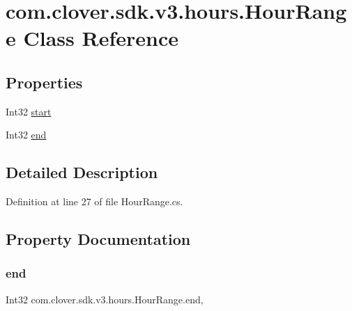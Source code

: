 \hypertarget{classcom_1_1clover_1_1sdk_1_1v3_1_1hours_1_1_hour_range}{}\section{com.\+clover.\+sdk.\+v3.\+hours.\+Hour\+Range Class Reference}
\label{classcom_1_1clover_1_1sdk_1_1v3_1_1hours_1_1_hour_range}
\subsection*{Properties}
\begin{DoxyCompactItemize}
\item 
Int32 \hyperlink{classcom_1_1clover_1_1sdk_1_1v3_1_1hours_1_1_hour_range_a60dfdcfa17bb5b0e7ef47fdf5b3d6cde}{start}
\item 
Int32 \hyperlink{classcom_1_1clover_1_1sdk_1_1v3_1_1hours_1_1_hour_range_a282272ee5138fddb43bba1e960b979c8}{end}
\end{DoxyCompactItemize}


\subsection{Detailed Description}


Definition at line 27 of file Hour\+Range.\+cs.



\subsection{Property Documentation}
\mbox{\label{classcom_1_1clover_1_1sdk_1_1v3_1_1hours_1_1_hour_range_a282272ee5138fddb43bba1e960b979c8}} 
\subsubsection{\texorpdfstring{end}{end}}
{\footnotesize\ttfamily Int32 com.\+clover.\+sdk.\+v3.\+hours.\+Hour\+Range.\+end\hspace{0.3cm}{\ttfamily [get]}, {\ttfamily [set]}}



